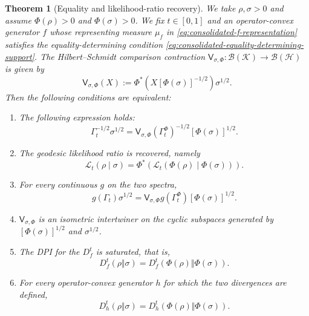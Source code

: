 \documentclass[11pt]{article}
\newtheorem{theorem}[theorem]{Theorem}
\theoremstyle{remark}
\newcommand{\1}{\mathbbm{1}}
\begin{document}
\begin{theorem}[Equality and likelihood-ratio recovery]
\label{thm:consolidated-equality-recovery}
We take $\rho,\sigma>0$ and assume $\Phi(\rho)>0$ and
$\Phi(\sigma)>0$.
We fix $t\in[0,1]$ and an operator-convex generator $f$ whose
representing measure $\mu_f$ in
\eqref{eq:consolidated-f-representation} satisfies the
equality-determining condition
\eqref{eq:consolidated-equality-determining-support}.  The
Hilbert--Schmidt comparison contraction
$\mathsf V_{\sigma,\Phi}:\mathcal B(\mathcal K)\to
\mathcal B(\mathcal H)$ is given by
\begin{equation}
 \mathsf V_{\sigma,\Phi}(X)
 :=\Phi^*\!\left(X[\Phi(\sigma)]^{-1/2}\right)\sigma^{1/2}.
 \label{eq:equality-theorem-comparison-map}
\end{equation}
Then the following conditions are equivalent:
\begin{enumerate}
\item The following expression holds:
\begin{equation}
 \Gamma_t^{-1/2}\sigma^{1/2}
 =\mathsf V_{\sigma,\Phi}
   (\Gamma_t^\Phi)^{-1/2}[\Phi(\sigma)]^{1/2}.
 \label{eq:consolidated-half-equality}
\end{equation}
\item The geodesic likelihood ratio is recovered, namely
\begin{equation*}
 \mathcal L_t(\rho\mid\sigma)
 =\Phi^*\!\left(
 \mathcal L_t(\Phi(\rho)\mid\Phi(\sigma))\right).
\end{equation*}
\item For every continuous $g$ on the two spectra,
\begin{equation}
 g(\Gamma_t)\sigma^{1/2}
 =\mathsf V_{\sigma,\Phi}
   g(\Gamma_t^\Phi)[\Phi(\sigma)]^{1/2}.
 \label{eq:consolidated-all-g}
\end{equation}
\item $\mathsf V_{\sigma,\Phi}$ is an isometric intertwiner on the
cyclic subspaces generated by $[\Phi(\sigma)]^{1/2}$ and
$\sigma^{1/2}$.
\item The DPI for the $D_f^t$ is saturated, that is,
\begin{equation}
 D_f^t(\rho\Vert\sigma)
 =D_f^t(\Phi(\rho)\Vert\Phi(\sigma)).
 \label{eq:consolidated-Dft-equality}
\end{equation}
\item For every operator-convex generator $h$ for which the two
divergences are defined,
\begin{equation}
 D_h^t(\rho\Vert\sigma)
 =D_h^t(\Phi(\rho)\Vert\Phi(\sigma)).

\end{equation}
\end{enumerate}
\end{theorem}
\end{document}
